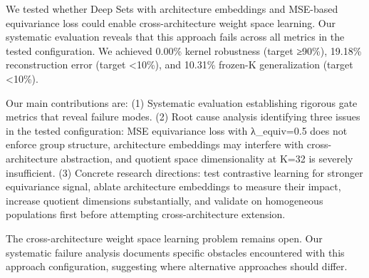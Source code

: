 
We tested whether Deep Sets with architecture embeddings and MSE-based equivariance loss could enable cross-architecture weight space learning. Our systematic evaluation reveals that this approach fails across all metrics in the tested configuration. We achieved 0.00\% kernel robustness (target ≥90\%), 19.18\% reconstruction error (target <10\%), and 10.31\% frozen-K generalization (target <10\%).

Our main contributions are: (1) Systematic evaluation establishing rigorous gate metrics that reveal failure modes. (2) Root cause analysis identifying three issues in the tested configuration: MSE equivariance loss with λ_equiv=0.5 does not enforce group structure, architecture embeddings may interfere with cross-architecture abstraction, and quotient space dimensionality at K=32 is severely insufficient. (3) Concrete research directions: test contrastive learning for stronger equivariance signal, ablate architecture embeddings to measure their impact, increase quotient dimensions substantially, and validate on homogeneous populations first before attempting cross-architecture extension.

The cross-architecture weight space learning problem remains open. Our systematic failure analysis documents specific obstacles encountered with this approach configuration, suggesting where alternative approaches should differ.
